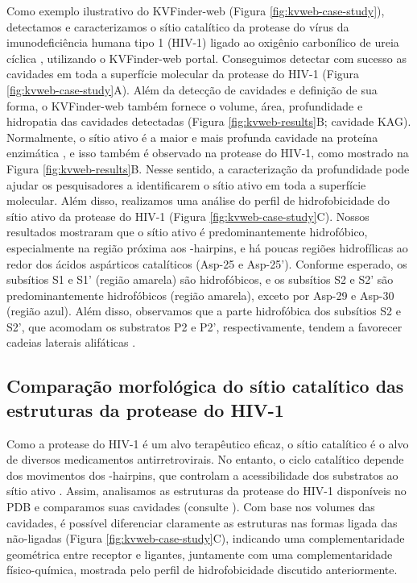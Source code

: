 \documentclass[Portugues]{phdquali}
\begin{document}
Como exemplo ilustrativo do KVFinder-web (Figura \ref{fig:kvweb-case-study}), detectamos e caracterizamos o sítio catalítico da protease do vírus da imunodeficiência humana tipo 1 (HIV-1) ligado ao oxigênio carbonílico de ureia cíclica \cite{lam1994}, utilizando o KVFinder-web portal. Conseguimos detectar com sucesso as cavidades em toda a superfície molecular da protease do HIV-1 (Figura \ref{fig:kvweb-case-study}A). Além da detecção de cavidades e definição de sua forma, o KVFinder-web também fornece o volume, área, profundidade e hidropatia das cavidades detectadas (Figura \ref{fig:kvweb-results}B; cavidade KAG). Normalmente, o sítio ativo é a maior e mais profunda cavidade na proteína enzimática \cite{laskowski1996}, e isso também é observado na protease do HIV-1, como mostrado na Figura \ref{fig:kvweb-results}B. Nesse sentido, a caracterização da profundidade pode ajudar os pesquisadores a identificarem o sítio ativo em toda a superfície molecular. Além disso, realizamos uma análise do perfil de hidrofobicidade do sítio ativo da protease do HIV-1 (Figura \ref{fig:kvweb-case-study}C). Nossos resultados mostraram que o sítio ativo é predominantemente hidrofóbico, especialmente na região próxima aos \textbeta-hairpins, e há poucas regiões hidrofílicas ao redor dos ácidos aspárticos catalíticos (Asp-25 e Asp-25'). Conforme esperado, os subsítios S1 e S1' (região amarela) são hidrofóbicos, e os subsítios S2 e S2' são predominantemente hidrofóbicos (região amarela), exceto por Asp-29 e Asp-30 (região azul). Além disso, observamos que a parte hidrofóbica dos subsítios S2 e S2', que acomodam os substratos P2 e P2', respectivamente, tendem a favorecer cadeias laterais alifáticas \cite{lam1994,brik2002,weber2009}.

\subsection{Comparação morfológica do sítio catalítico das estruturas da protease do HIV-1}

Como a protease do HIV-1 é um alvo terapêutico eficaz, o sítio catalítico é o alvo de diversos medicamentos antirretrovirais. No entanto, o ciclo catalítico depende dos movimentos dos \textbeta-hairpins, que controlam a acessibilidade dos substratos ao sítio ativo \cite{lam1994,soares2016}. Assim, analisamos as estruturas da protease do HIV-1 disponíveis no PDB e comparamos suas cavidades (consulte \cite{guerra2023A}). Com base nos volumes das cavidades, é possível diferenciar claramente as estruturas nas formas ligada das não-ligadas (Figura \ref{fig:kvweb-case-study}C), indicando uma complementaridade geométrica entre receptor e ligantes, juntamente com uma complementaridade físico-química, mostrada pelo perfil de hidrofobicidade discutido anteriormente.
\end{document}
